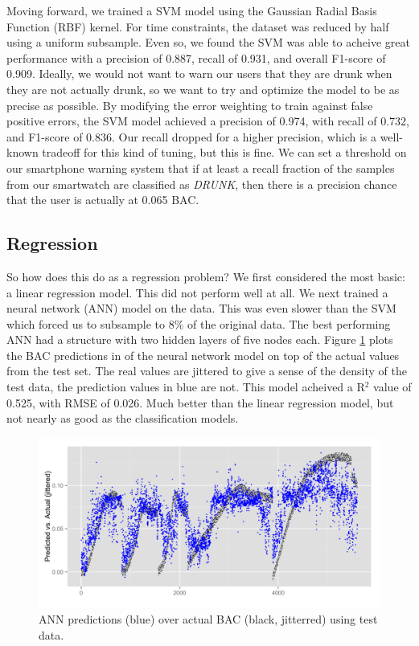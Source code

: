 Moving forward, we trained a SVM model using the Gaussian Radial Basis Function (RBF) kernel. For time constraints, the dataset was reduced by half using a uniform subsample. Even so, we found the SVM was able to acheive great performance with a precision of 0.887, recall of 0.931, and overall F1-score of 0.909. Ideally, we would not want to warn our users that they are drunk when they are not actually drunk, so we want to try and optimize the model to be as precise as possible. By modifying the error weighting to train against false positive errors, the SVM model achieved a precision of 0.974, with recall of 0.732, and F1-score of 0.836. Our recall dropped for a higher precision, which is a well-known tradeoff for this kind of tuning, but this is fine. We can set a threshold on our smartphone warning system that if at least a recall fraction of the samples from our smartwatch are classified as \textit{DRUNK}, then there is a precision chance that the user is actually at 0.065 BAC.

\subsection{Regression}

So how does this do as a regression problem? We first considered the most basic: a linear regression model. This did not perform well at all. We next trained a neural network (ANN) model on the data. This was even slower than the SVM which forced us to subsample to 8\% of the original data. The best performing ANN had a structure with two hidden layers of five nodes each. Figure \ref{fig:nn_all} plots the BAC predictions in of the neural network model on top of the actual values from the test set. The real values are jittered to give a sense of the density of the test data, the prediction values in blue are not. This model acheived a R$^2$ value of 0.525, with RMSE of 0.026. Much better than the linear regression model, but not nearly as good as the classification models.

\begin{figure}
	\includegraphics[width=1.0\textwidth]{../figs/nn_all}
	\caption{ANN predictions (blue) over actual BAC (black, jitterred) using test data.}
	\label{fig:nn_all}
\end{figure}